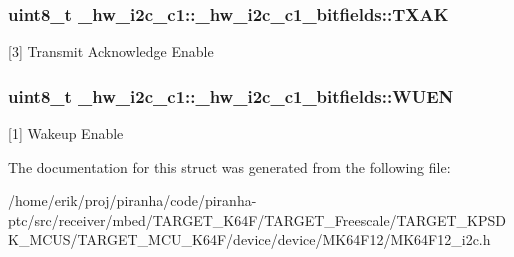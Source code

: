 \subsubsection[{\texorpdfstring{T\+X\+AK}{TXAK}}]{\setlength{\rightskip}{0pt plus 5cm}uint8\+\_\+t \+\_\+hw\+\_\+i2c\+\_\+c1\+::\+\_\+hw\+\_\+i2c\+\_\+c1\+\_\+bitfields\+::\+T\+X\+AK}\hypertarget{struct__hw__i2c__c1_1_1__hw__i2c__c1__bitfields_aef52db94498e9b01206982873ddce7de}{}\label{struct__hw__i2c__c1_1_1__hw__i2c__c1__bitfields_aef52db94498e9b01206982873ddce7de}
\mbox{[}3\mbox{]} Transmit Acknowledge Enable 
\subsubsection[{\texorpdfstring{W\+U\+EN}{WUEN}}]{\setlength{\rightskip}{0pt plus 5cm}uint8\+\_\+t \+\_\+hw\+\_\+i2c\+\_\+c1\+::\+\_\+hw\+\_\+i2c\+\_\+c1\+\_\+bitfields\+::\+W\+U\+EN}\hypertarget{struct__hw__i2c__c1_1_1__hw__i2c__c1__bitfields_af40a673ead308a401b260272c50b502a}{}\label{struct__hw__i2c__c1_1_1__hw__i2c__c1__bitfields_af40a673ead308a401b260272c50b502a}
\mbox{[}1\mbox{]} Wakeup Enable 

The documentation for this struct was generated from the following file\+:\begin{DoxyCompactItemize}
\item 
/home/erik/proj/piranha/code/piranha-\/ptc/src/receiver/mbed/\+T\+A\+R\+G\+E\+T\+\_\+\+K64\+F/\+T\+A\+R\+G\+E\+T\+\_\+\+Freescale/\+T\+A\+R\+G\+E\+T\+\_\+\+K\+P\+S\+D\+K\+\_\+\+M\+C\+U\+S/\+T\+A\+R\+G\+E\+T\+\_\+\+M\+C\+U\+\_\+\+K64\+F/device/device/\+M\+K64\+F12/M\+K64\+F12\+\_\+i2c.\+h\end{DoxyCompactItemize}
